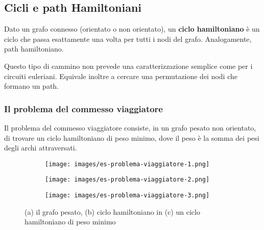 \subsection{Cicli e path Hamiltoniani}
\begin{definition}
    Dato un grafo connesso (orientato o non orientato), un \textbf{ciclo hamiltoniano} è un ciclo che passa esattamente una volta per tutti i nodi del grafo. Analogamente, path hamiltoniano.
\end{definition}
Questo tipo di cammino non prevede una caratterizzazione semplice come per i circuiti euleriani. Equivale inoltre a cercare una permutazione dei nodi che formano un path.

\subsubsection{Il problema del commesso viaggiatore}
Il problema del commesso viaggiatore consiste, in un grafo pesato non orientato, di trovare un ciclo hamiltoniano di peso minimo, dove il peso è la somma dei pesi degli archi attraversati.
\begin{figure}[h!]
    \centering
    \begin{subfigure}{.3\textwidth}
        \centering
        \texttt{[image: images/es-problema-viaggiatore-1.png]}
        \caption{}
    \end{subfigure}
    \hfill
    \begin{subfigure}{.3\textwidth}
        \centering
        \texttt{[image: images/es-problema-viaggiatore-2.png]}
        \caption{}
    \end{subfigure}
    \hfill
    \begin{subfigure}{.3\textwidth}
        \centering
        \texttt{[image: images/es-problema-viaggiatore-3.png]}
        \caption{}
    \end{subfigure}
    \caption{(a) il grafo pesato, (b) ciclo hamiltoniano in (c) un ciclo hamiltoniano di peso minimo}
\end{figure}


